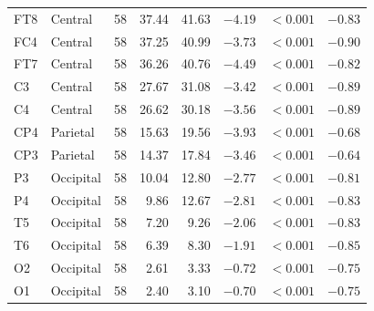\begin{longtable}{llrrrrrr}
FT8 & Central & 58 & 37.44 & 41.63 & $-4.19$ & $\mathbf{<0.001}$ & $-0.83$ \\
FC4 & Central & 58 & 37.25 & 40.99 & $-3.73$ & $\mathbf{<0.001}$ & $-0.90$ \\
FT7 & Central & 58 & 36.26 & 40.76 & $-4.49$ & $\mathbf{<0.001}$ & $-0.82$ \\
C3 & Central & 58 & 27.67 & 31.08 & $-3.42$ & $\mathbf{<0.001}$ & $-0.89$ \\
C4 & Central & 58 & 26.62 & 30.18 & $-3.56$ & $\mathbf{<0.001}$ & $-0.89$ \\
CP4 & Parietal & 58 & 15.63 & 19.56 & $-3.93$ & $\mathbf{<0.001}$ & $-0.68$ \\
CP3 & Parietal & 58 & 14.37 & 17.84 & $-3.46$ & $\mathbf{<0.001}$ & $-0.64$ \\
P3 & Occipital & 58 & 10.04 & 12.80 & $-2.77$ & $\mathbf{<0.001}$ & $-0.81$ \\
P4 & Occipital & 58 & 9.86 & 12.67 & $-2.81$ & $\mathbf{<0.001}$ & $-0.83$ \\
T5 & Occipital & 58 & 7.20 & 9.26 & $-2.06$ & $\mathbf{<0.001}$ & $-0.83$ \\
T6 & Occipital & 58 & 6.39 & 8.30 & $-1.91$ & $\mathbf{<0.001}$ & $-0.85$ \\
O2 & Occipital & 58 & 2.61 & 3.33 & $-0.72$ & $\mathbf{<0.001}$ & $-0.75$ \\
O1 & Occipital & 58 & 2.40 & 3.10 & $-0.70$ & $\mathbf{<0.001}$ & $-0.75$ \\
\end{longtable}
\endgroup
\twocolumn
